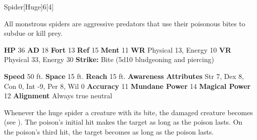   \begin{monsection}{Spider}[Huge]{6}[4]
    \vspace{-1em}\vspace{-1em}
    \vspace{0em}

    
    All monstrous spiders are aggressive predators that use their poisonous bites to subdue or kill prey.
  
    

    \begin{spellcontent}
      \begin{spelltargetinginfo}
        \pari \textbf{HP} 36 \monsep
          \textbf{AD} 18 \monsep
          \textbf{Fort} 13 \monsep
          \textbf{Ref} 15 \monsep
          \textbf{Ment} 11
        \pari \textbf{WR} Physical 13, Energy 10 \monsep
        \textbf{VR} Physical 33, Energy 30
        \pari \textbf{Strike:}
            Bite  (5d10 bludgeoning and piercing)
      \end{spelltargetinginfo}
    \end{spellcontent}
    \begin{monsterfooter}
      \pari \textbf{Speed} 50 ft. \monsep
        \textbf{Space} 15 ft. \monsep
        \textbf{Reach} 15 ft.
      \pari \textbf{Awareness} 
      \pari \textbf{Attributes}
        Str 7, Dex 8,
        Con 0, Int -9,
        Per 8, Wil 0
      \pari \textbf{Accuracy} 11 \monsep
        \textbf{Mundane Power} 14 \monsep
      \textbf{Magical Power} 12
      \pari \textbf{Alignment} Always true neutral
    \end{monsterfooter}
  \end{monsection}
        Whenever the huge spider  a creature with its bite,
          the damaged creature becomes  (see ).
        The poison's initial hit makes the target  as long as the poison lasts.
        On the poison's third hit, the target becomes  as long as the poison lasts.
  
